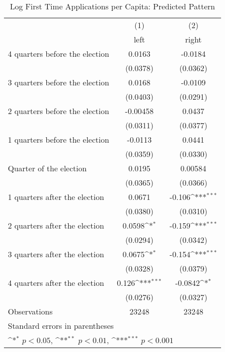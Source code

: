 \begin{table}[htbp]\centering
\def\sym#1{\ifmmode^{#1}\else\(^{#1}\)\fi}
\caption{Log First Time Applications per Capita: Predicted Pattern}
\begin{tabular}{l*{2}{c}}
\hline\hline
                    &\multicolumn{1}{c}{(1)}&\multicolumn{1}{c}{(2)}\\
                    &\multicolumn{1}{c}{left}&\multicolumn{1}{c}{right}\\
\hline
 4 quarters before the election&      0.0163         &     -0.0184         \\
                    &    (0.0378)         &    (0.0362)         \\
[1em]
 3 quarters before the election&      0.0168         &     -0.0109         \\
                    &    (0.0403)         &    (0.0291)         \\
[1em]
 2 quarters before the election&    -0.00458         &      0.0437         \\
                    &    (0.0311)         &    (0.0377)         \\
[1em]
 1 quarters before the election&     -0.0113         &      0.0441         \\
                    &    (0.0359)         &    (0.0330)         \\
[1em]
Quarter of the election&      0.0195         &     0.00584         \\
                    &    (0.0365)         &    (0.0366)         \\
[1em]
 1 quarters after the election&      0.0671         &      -0.106\sym{***}\\
                    &    (0.0380)         &    (0.0310)         \\
[1em]
 2 quarters after the election&      0.0598\sym{*}  &      -0.159\sym{***}\\
                    &    (0.0294)         &    (0.0342)         \\
[1em]
 3 quarters after the election&      0.0675\sym{*}  &      -0.154\sym{***}\\
                    &    (0.0328)         &    (0.0379)         \\
[1em]
 4 quarters after the election&       0.126\sym{***}&     -0.0842\sym{*}  \\
                    &    (0.0276)         &    (0.0327)         \\
\hline
Observations        &       23248         &       23248         \\
\hline\hline
\multicolumn{3}{l}{\footnotesize Standard errors in parentheses}\\
\multicolumn{3}{l}{\footnotesize \sym{*} \(p<0.05\), \sym{**} \(p<0.01\), \sym{***} \(p<0.001\)}\\
\end{tabular}
\end{table}
